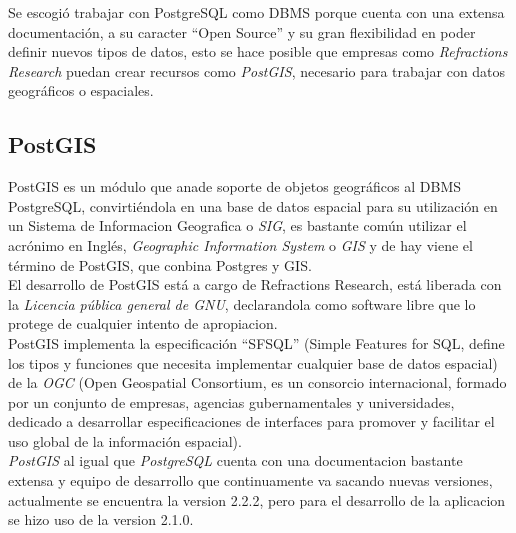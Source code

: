       Se escogió trabajar con  PostgreSQL como DBMS porque cuenta con una extensa documentación, a su caracter ``Open Source'' y su gran flexibilidad en poder definir nuevos tipos de datos, esto se hace posible que empresas como \emph{Refractions Research} puedan crear recursos como \emph{PostGIS}, necesario para trabajar con datos geográficos o espaciales.




    \subsection{PostGIS} %
    \label{sec:postgis}

      PostGIS es un módulo  que anade soporte de objetos geográficos al DBMS PostgreSQL, convirtiéndola en una base de datos espacial para su utilización en un Sistema de Informacion Geografica o \emph{SIG}, es bastante común utilizar el acrónimo en Inglés, \emph{Geographic Information System} o \emph{GIS} y de hay viene el término de PostGIS, que conbina Postgres y GIS.\\

      El desarrollo de PostGIS está a cargo de Refractions Research, está liberada con la \emph{Licencia pública general de GNU}, declarandola como software libre que lo protege de cualquier intento de apropiacion.\\

      PostGIS implementa la especificaci\'on ``SFSQL'' (Simple Features for SQL, define los tipos y funciones que necesita implementar cualquier base de datos espacial) de la \emph{OGC} (Open Geospatial Consortium, es un consorcio internacional, formado por un conjunto de empresas, agencias gubernamentales y universidades, dedicado a desarrollar especificaciones de interfaces para promover y facilitar el uso global de la información espacial).\\

      \emph{PostGIS} al igual que \emph{PostgreSQL} cuenta con una documentacion bastante extensa y equipo de desarrollo que continuamente va sacando nuevas versiones, actualmente se encuentra la version 2.2.2, pero para el desarrollo de la aplicacion se hizo uso de la version 2.1.0.\\

